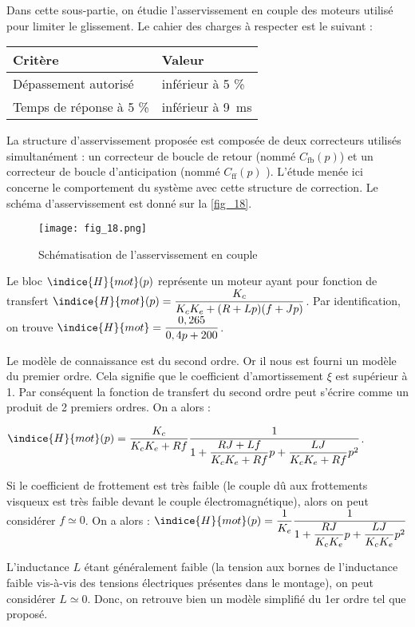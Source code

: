 \begin{obj}
Dans cette sous-partie, on étudie l’asservissement en couple des moteurs utilisé pour
limiter le glissement. Le cahier des charges à respecter est le suivant :

\begin{center}
\begin{tabular}{ll}
\hline
\textbf{Critère} & \textbf{Valeur} \\ \hline \hline
Dépassement autorisé & inférieur à 5 \% \\ \hline
Temps de réponse à 5 \% & inférieur à \SI{9}{ms} \\ \hline
\end{tabular}
\end{center}

\end{obj}


\ifprof
\else

La structure d’asservissement proposée est composée de deux correcteurs utilisés simultanément :
un correcteur de boucle de retour (nommé $C_{\text{fb}}( p)$) et un correcteur de boucle d'anticipation
(nommé $C_{\text{ff}}( p)$ ). L’étude menée ici concerne le comportement du système avec cette structure
de correction.
Le schéma d'asservissement est donné sur la \autoref{fig_18}.

\begin{figure}[H]
\centering
\texttt{[image: fig\_18.png]}
\caption{Schématisation de l'asservissement en couple \label{fig_18}}
\end{figure}


Le bloc  $\indice{H}{mot} (p)$ représente un moteur ayant pour fonction de transfert
$\indice{H}{mot} (p)=\dfrac{K_c}{K_c K_e+(R+Lp)( f +Jp)}$. Par identification, on trouve $\indice{H}{mot}= \dfrac{0,265}{0,4 p+200}$.
\fi


\ifprof
\begin{corrige}
Le modèle de connaissance est du second ordre. Or il nous est fourni un modèle du premier ordre. Cela signifie que le coefficient d’amortissement $\xi$ est supérieur à 1. Par conséquent la fonction de transfert du second ordre peut s’écrire comme un produit de 2 premiers ordres.
On a alors :

$\indice{H}{mot} (p)=\dfrac{K_c}{K_c K_e+Rf}\dfrac{1}{1+\dfrac{RJ+Lf}{K_c K_e+Rf} p+\dfrac{LJ}{K_c K_e+Rf} p^2}$.
 
Si le coefficient de frottement est très faible (le couple dû aux frottements visqueux est très faible devant le couple électromagnétique), alors on peut considérer $f \simeq 0$.
On a alors :
$\indice{H}{mot} (p)=\dfrac{1}{K_e} \dfrac{1}{1+\dfrac{RJ}{K_c K_e} p+\dfrac{LJ}{K_c K_e} p^2}$

L’inductance $L$ étant généralement faible (la tension aux bornes de l’inductance faible vis-à-vis des tensions électriques présentes dans le montage), on peut considérer $L \simeq 0$.
Donc, on retrouve bien un modèle simplifié du 1er ordre tel que proposé.
 

\end{corrige}
\else
\fi

